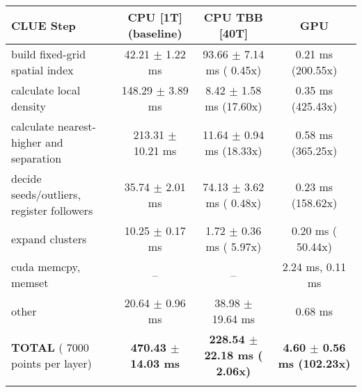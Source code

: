     \begin{tabular}{l|c|c|c}
    \hline
    CLUE Step                                 & CPU [1T] (baseline)         & CPU TBB [40T]                         & GPU                       \\ \hline
    build fixed-grid spatial index            &  42.21 $\pm$  1.22 ms       &  93.66 $\pm$  7.14 ms ( 0.45x)        &   0.21 ms (200.55x)       \\
    calculate local density                   & 148.29 $\pm$  3.89 ms       &   8.42 $\pm$  1.58 ms (17.60x)        &   0.35 ms (425.43x)       \\
    calculate nearest-higher and separation   & 213.31 $\pm$ 10.21 ms       &  11.64 $\pm$  0.94 ms (18.33x)        &   0.58 ms (365.25x)       \\
    decide seeds/outliers, register followers &  35.74 $\pm$  2.01 ms       &  74.13 $\pm$  3.62 ms ( 0.48x)        &   0.23 ms (158.62x)       \\
    expand clusters                           &  10.25 $\pm$  0.17 ms       &   1.72 $\pm$  0.36 ms ( 5.97x)        &   0.20 ms ( 50.44x)       \\ \hline
    cuda memcpy, memset                       & --                          & --                                    &   2.24 ms,   0.11 ms      \\ 
    other                                     &  20.64 $\pm$  0.96 ms       &  38.98 $\pm$ 19.64 ms                 &   0.68 ms                 \\ \hline
    \textbf{TOTAL} ( 7000 points per layer)   & \textbf{470.43 $\pm$ 14.03 ms} & \textbf{228.54 $\pm$ 22.18 ms ( 2.06x)} & \textbf{  4.60 $\pm$  0.56 ms (102.23x)}  \\
    \hline
    \multicolumn{4}{c}{} 
    \end{tabular}
    \linebreak


